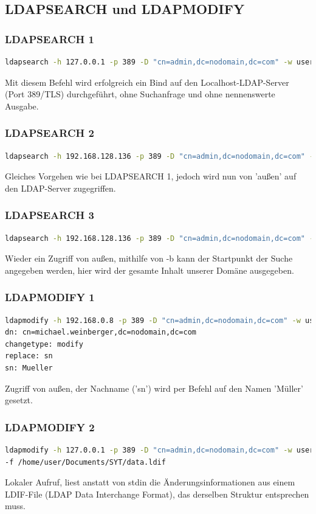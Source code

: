 \documentclass[letterpaper, 12pt]{article}
\let\tempsubsection\subsection
\renewcommand\subsection[1]{\vspace{0cm}\tempsubsection{#1}\vspace{0cm}}
\let\tempsubsubsection\subsubsection
\renewcommand\subsubsection[1]{\vspace{0cm}\tempsubsubsection{#1}\vspace{0cm}}
\begin{document}
\subsection{LDAPSEARCH und LDAPMODIFY}
\subsubsection{LDAPSEARCH 1}
\begin{lstlisting}[frame=single, language=bash, caption=1.Befehl]
ldapsearch -h 127.0.0.1 -p 389 -D "cn=admin,dc=nodomain,dc=com" -w user
\end{lstlisting} 
Mit diesem Befehl wird erfolgreich ein Bind auf den Localhost-LDAP-Server (Port 389/TLS) durchgeführt, ohne Suchanfrage und ohne nennenswerte Ausgabe.
\subsubsection{LDAPSEARCH 2}
\begin{lstlisting}[frame=single, language=bash, caption=2.Befehl]
ldapsearch -h 192.168.128.136 -p 389 -D "cn=admin,dc=nodomain,dc=com" -w user
\end{lstlisting} 
Gleiches Vorgehen wie bei LDAPSEARCH 1, jedoch wird nun von 'außen' auf den LDAP-Server zugegriffen.
\subsubsection{LDAPSEARCH 3}
\begin{lstlisting}[frame=single, language=bash, caption=3.Befehl]
ldapsearch -h 192.168.128.136 -p 389 -D "cn=admin,dc=nodomain,dc=com" -w user -b "dc=nodomain,dc=com"
\end{lstlisting} 
Wieder ein Zugriff von außen, mithilfe von -b kann der Startpunkt der Suche angegeben werden, hier wird der gesamte Inhalt unserer Domäne ausgegeben.
\subsubsection{LDAPMODIFY 1}
\begin{lstlisting}[frame=single, language=bash, caption=4.Befehl]
ldapmodify -h 192.168.0.8 -p 389 -D "cn=admin,dc=nodomain,dc=com" -w user
dn: cn=michael.weinberger,dc=nodomain,dc=com
changetype: modify
replace: sn
sn: Mueller
\end{lstlisting} 
Zugriff von außen, der Nachname ('sn') wird per Befehl auf den Namen 'Müller' gesetzt.
\subsubsection{LDAPMODIFY 2}
\begin{lstlisting}[frame=single, language=bash, caption=5.Befehl]
ldapmodify -h 127.0.0.1 -p 389 -D "cn=admin,dc=nodomain,dc=com" -w user 
-f /home/user/Documents/SYT/data.ldif
\end{lstlisting} 
Lokaler Aufruf, liest anstatt von stdin die Änderungsinformationen aus einem LDIF-File (LDAP Data Interchange Format), das derselben Struktur entsprechen muss.
\newpage
\end{document}
